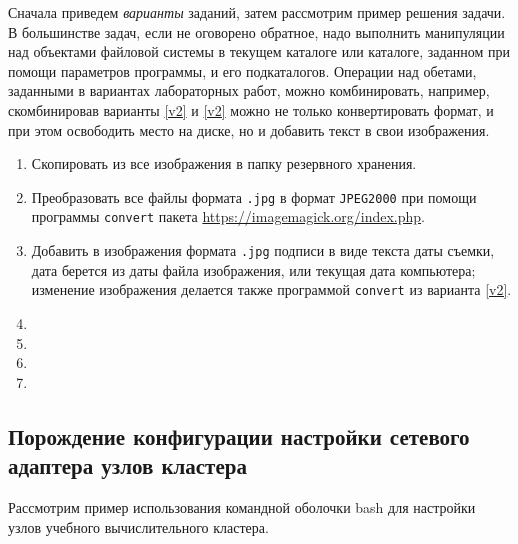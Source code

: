 \documentclass[12pt]{article}
\begin{document}
Сначала приведем \emph{варианты} заданий, затем рассмотрим пример решения задачи. В большинстве задач, если не оговорено обратное, надо выполнить манипуляции над объектами файловой системы в текущем каталоге или каталоге, заданном при помощи параметров программы, и его подкаталогов. Операции над обетами, заданными в вариантах лабораторных работ, можно комбинировать, например, скомбинировав варианты \ref{v2} и \ref{v2} можно не только конвертировать формат, и при этом освободить место на диске, но и добавить текст в свои изображения.
\begin{enumerate}
\item Скопировать из все изображения в папку резервного хранения.
\item Преобразовать все файлы формата \texttt{.jpg} в формат \texttt{JPEG2000} при помощи программы \texttt{convert} пакета \href{\texttt{ImageMagick}}{https://imagemagick.org/index.php}. \label{v2}
\item \label{v3} Добавить в изображения формата \texttt{.jpg} подписи в виде текста даты съемки, дата берется из даты файла изображения, или текущая дата компьютера; изменение изображения делается также программой \texttt{convert} из варианта \ref{v2}.
\item
\item
\item
\item
\end{enumerate}


\subsection{Порождение конфигурации настройки сетевого адаптера узлов кластера}

Рассмотрим пример использования командной оболочки bash для настройки узлов учебного вычислительного кластера.
\end{document}
